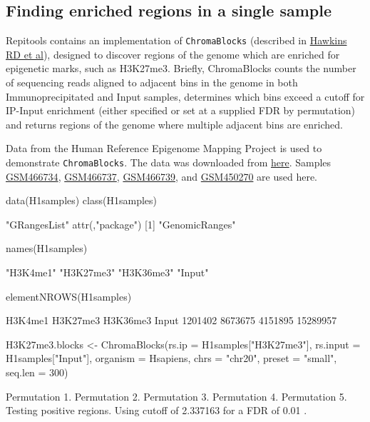 \subsection{Finding enriched regions in a single sample}
Repitools contains an implementation of \texttt{ChromaBlocks} (described in \href{http://www.ncbi.nlm.nih.gov/pubmed/20452322}{Hawkins RD et al}), designed to discover regions of the genome which are enriched for epigenetic marks, such as H3K27me3. Briefly, ChromaBlocks counts the number of sequencing reads aligned to adjacent bins in the genome in both Immunoprecipitated and Input samples, determines which bins exceed a cutoff for IP-Input enrichment (either specified or set at a supplied FDR by permutation) and returns regions of the genome where multiple adjacent bins are enriched.

\noindent Data from the Human Reference Epigenome Mapping Project is used to demonstrate \texttt{ChromaBlocks}. The data was downloaded from \href{http://www.ncbi.nlm.nih.gov/geo/query/acc.cgi?acc=GSE16256}{here}. Samples \href{http://www.ncbi.nlm.nih.gov/geo/query/acc.cgi?acc=GSM466734}{GSM466734}, \href{http://www.ncbi.nlm.nih.gov/geo/query/acc.cgi?acc=GSM466737}{GSM466737}, \href{http://www.ncbi.nlm.nih.gov/geo/query/acc.cgi?acc=GSM466739}{GSM466739}, and \href{http://www.ncbi.nlm.nih.gov/projects/geo/query/acc.cgi?acc=GSM450270}{GSM450270} are used here.

\begin{Schunk}
\begin{Sinput}
 data(H1samples)
 class(H1samples)
\end{Sinput}
\begin{Soutput}
[1] "GRangesList"
attr(,"package")
[1] "GenomicRanges"
\end{Soutput}
\begin{Sinput}
 names(H1samples)
\end{Sinput}
\begin{Soutput}
[1] "H3K4me1"  "H3K27me3" "H3K36me3" "Input"   
\end{Soutput}
\begin{Sinput}
 elementNROWS(H1samples)
\end{Sinput}
\begin{Soutput}
 H3K4me1 H3K27me3 H3K36me3    Input 
 1201402  8673675  4151895 15289957 
\end{Soutput}
\begin{Sinput}
 H3K27me3.blocks <- ChromaBlocks(rs.ip = H1samples["H3K27me3"],
                                 rs.input = H1samples["Input"],
                                 organism = Hsapiens, chrs = "chr20",
                                 preset = "small", seq.len = 300)
\end{Sinput}
\begin{Soutput}
Permutation 1.
Permutation 2.
Permutation 3.
Permutation 4.
Permutation 5.
Testing positive regions.
Using cutoff of 2.337163 for a FDR of 0.01 
.
\end{Soutput}
\end{Schunk}

